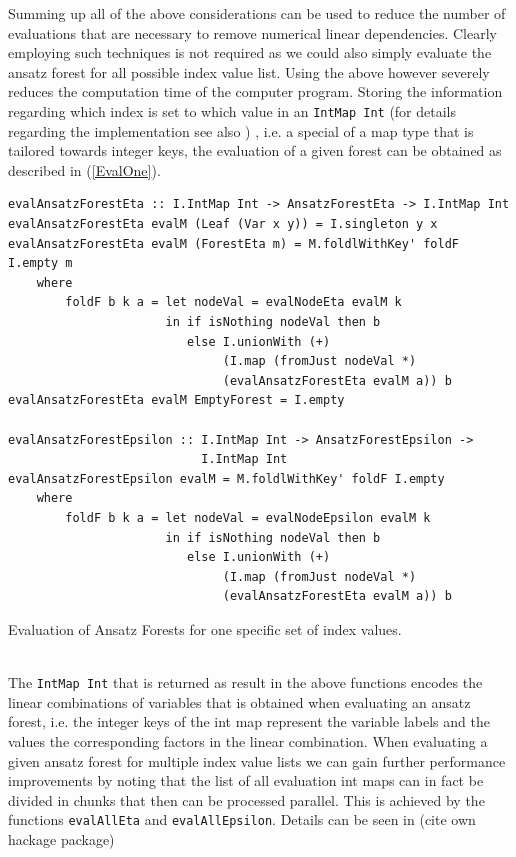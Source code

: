 \documentclass[a4paper,12pt, DIV=14, BCOR=5mm, twoside, headsepline, numbers=noenddot]{scrbook}
\begin{document}
Summing up all of the above considerations can be used to reduce the number of evaluations that are necessary to remove numerical linear dependencies. Clearly employing such techniques is not required as we could also simply evaluate the ansatz forest for all possible index value list. Using the above however severely reduces the computation time of the computer program. 
Storing the information regarding which index is set to which value in an \texttt{IntMap Int} \cite{HackageIntMap} (for details regarding the implementation see also \cite{Okasaki98fastmergeable}) , i.e. a special of a map type that is tailored towards integer keys, the evaluation of a given forest can be obtained as described in (\ref{EvalOne}).
\begin{listing}[hbt!]
\begin{verbatim}
evalAnsatzForestEta :: I.IntMap Int -> AnsatzForestEta -> I.IntMap Int
evalAnsatzForestEta evalM (Leaf (Var x y)) = I.singleton y x
evalAnsatzForestEta evalM (ForestEta m) = M.foldlWithKey' foldF I.empty m
    where
        foldF b k a = let nodeVal = evalNodeEta evalM k
                      in if isNothing nodeVal then b
                         else I.unionWith (+)
                              (I.map (fromJust nodeVal *)
                              (evalAnsatzForestEta evalM a)) b
evalAnsatzForestEta evalM EmptyForest = I.empty

evalAnsatzForestEpsilon :: I.IntMap Int -> AnsatzForestEpsilon ->
                           I.IntMap Int
evalAnsatzForestEpsilon evalM = M.foldlWithKey' foldF I.empty
    where
        foldF b k a = let nodeVal = evalNodeEpsilon evalM k
                      in if isNothing nodeVal then b
                         else I.unionWith (+) 
                              (I.map (fromJust nodeVal *)
                              (evalAnsatzForestEta evalM a)) b  
\end{verbatim} 
\caption{Evaluation of Ansatz Forests for one specific set of index values.}\label{EvalOne}
\end{listing}\\

The \texttt{IntMap Int} that is returned as result in the above functions encodes the linear combinations of variables that is obtained when evaluating an ansatz forest, i.e. the integer keys of the int map represent the variable labels and the values the corresponding factors in the linear combination. 
When evaluating a given ansatz forest for multiple index value lists we can gain further performance improvements by noting that the list of all evaluation int maps can in fact be divided in chunks that then can be processed parallel. This is achieved by the functions \texttt{evalAllEta} and \texttt{evalAllEpsilon}. Details can be seen in (cite own hackage package)\\
\end{document}
